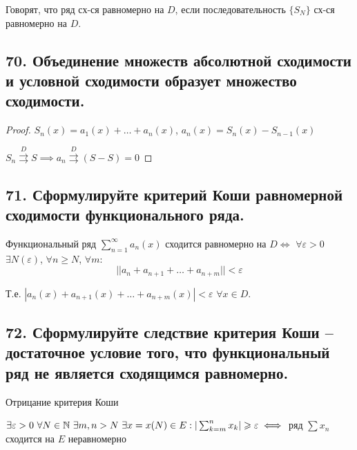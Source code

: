 \documentclass[a4paper, fleqn]{article}
\begin{document}
        Говорят, что ряд сх-ся равномерно на $D$, если последовательность $\{ S_N \}$ сх-ся равномерно на $D$.
        
        
    \subsection*{70. Объединение множеств абсолютной сходимости и
     условной сходимости образует множество сходимости.} 
     \begin{proof}
        $S_n(x) = a_1(x) + \dots + a_n(x)$, $a_n(x) =
         S_n(x) - S_{n-1}(x)$

        $S_n \overset{D}{\rightrightarrows}
         S \implies a_n \overset{D}{\rightrightarrows} (S - S) = 0$
        \end{proof}
    \subsection*{71. Сформулируйте критерий Коши равномерной сходимости функционального ряда.}
    Функциональный ряд $\sum_{n=1}^{\infty} a_n(x)$ сходится равномерно на $D \iff$ $\forall \varepsilon > 0$ $\exists N(\varepsilon)$, $\forall n \geq N$, $\forall m$: 
    $$||a_n + a_{n + 1} + \dots + a_{n + m}|| < \varepsilon$$
            
    Т.е. $|a_n(x) + a_{n + 1}(x) + \dots + a_{n + m}(x)| < \varepsilon$ $\forall x \in D$.
        
        \subsection*{72. Сформулируйте следствие критерия Коши -- достаточное условие того, что функциональный ряд не является сходящимся равномерно.}
        Отрицание критерия Коши 
            
        $\exists \varepsilon > 0\ \forall N \in \mathbb{N}\ \exists m,n > N\ \exists x = x(N) \in E: |\sum_{k = m}^n x_k| \geqslant \varepsilon \iff$ ряд $\sum x_n$ сходится на $E$ неравномерно
            
\end{document}
